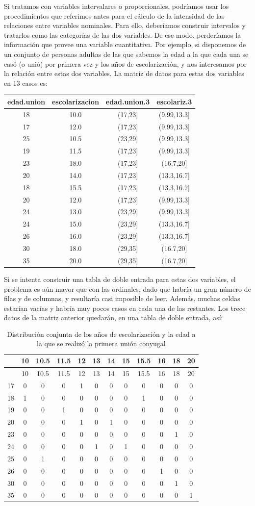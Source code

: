 \documentclass[]{book}
\begin{document}
Si tratamos con variables intervalares o proporcionales, podríamos usar los procedimientos que referimos antes para el cálculo de la intensidad de las relaciones entre variables nominales. Para ello, deberíamos construir intervalos y tratarlos como las categorías de las dos variables. De ese modo, perderíamos la información que provee una variable cuantitativa. Por ejemplo, si disponemos de un conjunto de personas adultas de las que sabemos la edad a la que cada una se casó (o unió) por primera vez y los años de escolarización, y nos interesamos por la relación entre estas dos variables. La matriz de datos para estas dos variables en 13 casos es:

\begin{longtable}[]{@{}cccc@{}}
\toprule
edad.union & escolarizacion & edad.union.3 & escolariz.3\tabularnewline
\midrule
\endhead
18 & 10.0 & (17,23{]} & (9.99,13.3{]}\tabularnewline
17 & 12.0 & (17,23{]} & (9.99,13.3{]}\tabularnewline
25 & 10.5 & (23,29{]} & (9.99,13.3{]}\tabularnewline
19 & 11.5 & (17,23{]} & (9.99,13.3{]}\tabularnewline
23 & 18.0 & (17,23{]} & (16.7,20{]}\tabularnewline
20 & 14.0 & (17,23{]} & (13.3,16.7{]}\tabularnewline
18 & 15.5 & (17,23{]} & (13.3,16.7{]}\tabularnewline
20 & 12.0 & (17,23{]} & (9.99,13.3{]}\tabularnewline
24 & 13.0 & (23,29{]} & (9.99,13.3{]}\tabularnewline
24 & 15.0 & (23,29{]} & (13.3,16.7{]}\tabularnewline
26 & 16.0 & (23,29{]} & (13.3,16.7{]}\tabularnewline
30 & 18.0 & (29,35{]} & (16.7,20{]}\tabularnewline
35 & 20.0 & (29,35{]} & (16.7,20{]}\tabularnewline
\bottomrule
\end{longtable}

Si se intenta construir una tabla de doble entrada para estas dos variables, el problema es aún mayor que con las ordinales, dado que habría un gran número de filas y de columnas, y resultaría casi imposible de leer. Además, muchas celdas estarían vacías y habría muy pocos casos en cada una de las restantes. Los trece datos de la matriz anterior quedarán, en una tabla de doble entrada, así:

\begin{longtable}[]{@{}lccccccccccc@{}}
\caption{\label{tab:distrConj}Distribución conjunta de los años de escolarización y la edad a la que se realizó la primera unión conyugal}\tabularnewline
\toprule
& 10 & 10.5 & 11.5 & 12 & 13 & 14 & 15 & 15.5 & 16 & 18 & 20\tabularnewline
\midrule
\endfirsthead
\toprule
& 10 & 10.5 & 11.5 & 12 & 13 & 14 & 15 & 15.5 & 16 & 18 & 20\tabularnewline
\midrule
\endhead
17 & 0 & 0 & 0 & 1 & 0 & 0 & 0 & 0 & 0 & 0 & 0\tabularnewline
18 & 1 & 0 & 0 & 0 & 0 & 0 & 0 & 1 & 0 & 0 & 0\tabularnewline
19 & 0 & 0 & 1 & 0 & 0 & 0 & 0 & 0 & 0 & 0 & 0\tabularnewline
20 & 0 & 0 & 0 & 1 & 0 & 1 & 0 & 0 & 0 & 0 & 0\tabularnewline
23 & 0 & 0 & 0 & 0 & 0 & 0 & 0 & 0 & 0 & 1 & 0\tabularnewline
24 & 0 & 0 & 0 & 0 & 1 & 0 & 1 & 0 & 0 & 0 & 0\tabularnewline
25 & 0 & 1 & 0 & 0 & 0 & 0 & 0 & 0 & 0 & 0 & 0\tabularnewline
26 & 0 & 0 & 0 & 0 & 0 & 0 & 0 & 0 & 1 & 0 & 0\tabularnewline
30 & 0 & 0 & 0 & 0 & 0 & 0 & 0 & 0 & 0 & 1 & 0\tabularnewline
35 & 0 & 0 & 0 & 0 & 0 & 0 & 0 & 0 & 0 & 0 & 1\tabularnewline
\bottomrule
\end{longtable}
\end{document}
